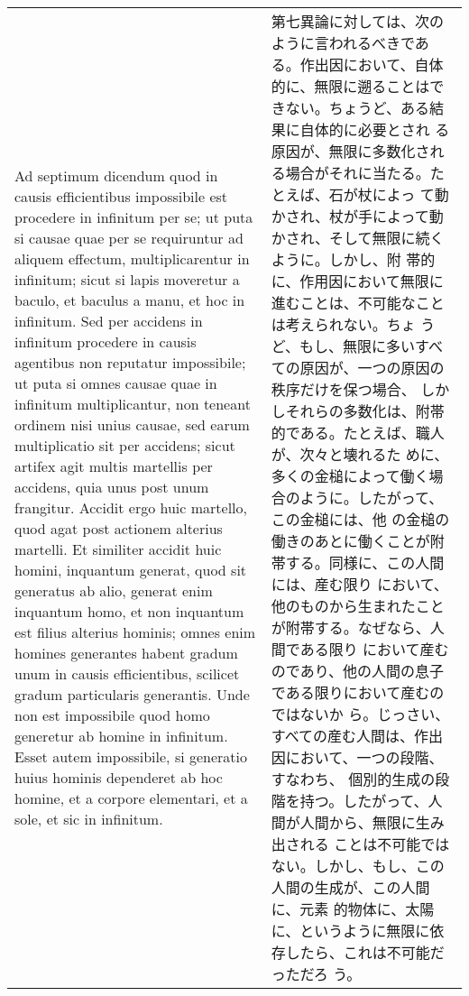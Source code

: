 \documentclass[10pt]{jsarticle} %
\begin{document}
\begin{longtable}{p{21em}p{21em}}
Ad septimum dicendum quod in causis efficientibus impossibile est
 procedere in infinitum per se; ut puta si causae quae per se
 requiruntur ad aliquem effectum, multiplicarentur in infinitum; sicut
 si lapis moveretur a baculo, et baculus a manu, et hoc in
 infinitum. Sed per accidens in infinitum procedere in causis agentibus
 non reputatur
 impossibile; ut puta si omnes causae quae in infinitum
 multiplicantur, non teneant ordinem nisi unius causae, sed earum
 multiplicatio sit per accidens; sicut artifex agit multis martellis per
 accidens, quia unus post unum frangitur. Accidit ergo huic martello,
 quod agat post actionem alterius martelli. Et similiter accidit huic
 homini, inquantum generat, quod sit generatus ab alio, generat enim
 inquantum homo, et non inquantum est filius alterius hominis; omnes
 enim homines generantes habent gradum unum in causis efficientibus,
 scilicet gradum particularis generantis. Unde non est impossibile quod
 homo generetur ab homine in infinitum. Esset autem impossibile, si
 generatio huius hominis dependeret ab hoc homine, et a corpore
 elementari, et a sole, et sic in infinitum.

&

第七異論に対しては、次のように言われるべきである。作出因において、自体
的に、無限に遡ることはできない。ちょうど、ある結果に自体的に必要とされ
る原因が、無限に多数化される場合がそれに当たる。たとえば、石が杖によっ
て動かされ、杖が手によって動かされ、そして無限に続くように。しかし、附
帯的に、作用因において無限に進むことは、不可能なことは考えられない。ちょ
うど、もし、無限に多いすべての原因が、一つの原因の秩序だけを保つ場合、
しかしそれらの多数化は、附帯的である。たとえば、職人が、次々と壊れるた
めに、多くの金槌によって働く場合のように。したがって、この金槌には、他
の金槌の働きのあとに働くことが附帯する。同様に、この人間には、産む限り
において、他のものから生まれたことが附帯する。なぜなら、人間である限り
において産むのであり、他の人間の息子である限りにおいて産むのではないか
ら。じっさい、すべての産む人間は、作出因において、一つの段階、すなわち、
個別的生成の段階を持つ。したがって、人間が人間から、無限に生み出される
ことは不可能ではない。しかし、もし、この人間の生成が、この人間に、元素
的物体に、太陽に、というように無限に依存したら、これは不可能だっただろ
う。


\end{longtable}
\end{document}
